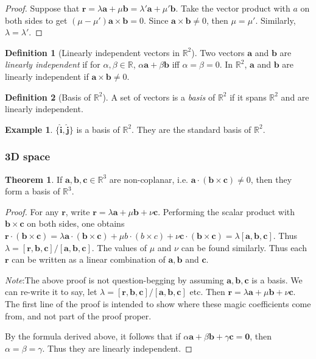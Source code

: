 \documentclass[a4paper]{article}
\theoremstyle{definition}
\newtheorem*{thm}{Theorem}
\newtheorem*{defi}{Definition}
\newtheorem*{eg}{Example}
\newcommand{\mb}[1]{\mathbf{#1}}
\newcommand{\note}{\noindent \emph{Note}:\;}
\newcommand{\R}{\mathbb{R}}
\begin{document}
\begin{proof}
  Suppose that $\mb{r} = \lambda\mb{a} + \mu\mb{b} = \lambda'\mb{a} + \mu'\mb{b}$. Take the vector product with $a$ on both sides to get $(\mu - \mu')\mb{a\times b} = 0$. Since $\mb{a\times b}\not= 0$, then $\mu=\mu'$. Similarly, $\lambda = \lambda'$.
\end{proof}

\begin{defi}[Linearly independent vectors in $\R^2$]
  Two vectors $\mb{a}$ and $\mb{b}$ are \emph{linearly independent} if  for $\alpha, \beta\in \R$, $\alpha\mb{a} + \beta\mb{b}$ iff $\alpha = \beta = 0$. In $\R^2$, $\mb{a}$ and $\mb{b}$ are linearly independent if $\mb{a\times b} \not= 0$.
\end{defi}

\begin{defi}[Basis of $\R^2$]
  A set of vectors is a \emph{basis} of $\R^2$ if it spans $\R^2$ and are linearly independent.
\end{defi}

\begin{eg}
  $\mb{\{\hat{i}, \hat{j}\}}$ is a basis of $\R^2$. They are the standard basis of $\R^2$.
\end{eg}

\subsubsection{3D space}
\begin{thm}
  If $\mb{a, b, c}\in\R^3$ are non-coplanar, i.e. $\mb{a\cdot(b\times c)}\not= 0$, then they form a basis of $\R^3$.
\end{thm}

\begin{proof}
  For any $\mb{r}$, write $\mb{r} = \lambda\mb{a} + \mu\mb{b} + \nu\mb{c}$. Performing the scalar product with $\mb{b\times c}$ on both sides, one obtains $\mb{r\cdot(b\times c)} = \lambda \mb{a\cdot(b\times c)} + \mu{b\cdot (b\times c)} + \nu\mb{c\cdot(b\times c)} = \lambda \mb{[a, b, c]}$. Thus $\lambda = \mb{[r, b, c]/[a,b, c]}$. The values of $\mu$ and $\nu$ can be found similarly. Thus each $\mb{r}$ can be written as a linear combination of $\mb{a, b}$ and $\mb{c}$.

\note The above proof is not question-begging by assuming $\mb{a, b, c}$ is a basis. We can re-write it to say, let $\lambda = \mb{[r, b, c]/[a,b, c]}$ etc. Then $\mb{r} = \lambda\mb{a} + \mu\mb{b} + \nu\mb{c}$. The first line of the proof is intended to show where these magic coefficients come from, and not part of the proof proper.

By the formula derived above, it follows that if $\alpha\mb{a} + \beta\mb{b} + \gamma\mb{c} = \mb{0}$, then $\alpha = \beta = \gamma$. Thus they are linearly independent.
\end{proof}
\end{document}
